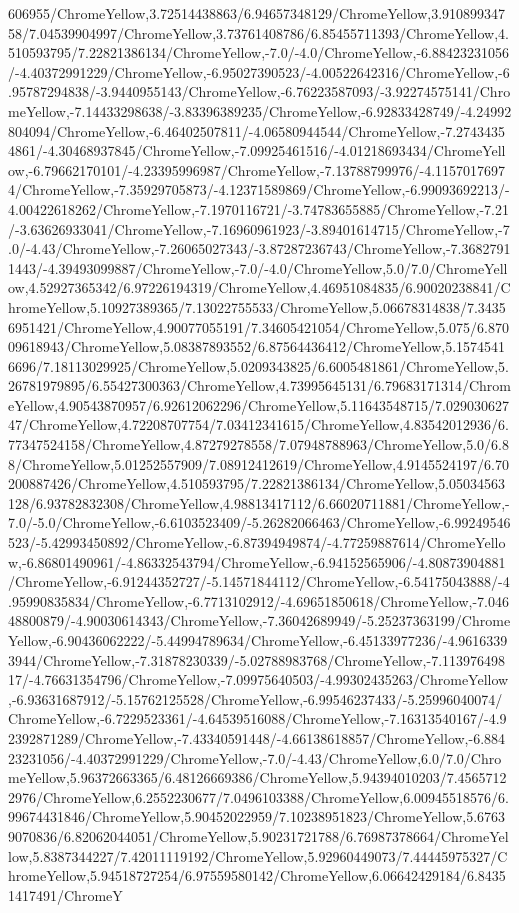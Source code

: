 {\begin{tikzternal}
606955/ChromeYellow,3.72514438863/6.94657348129/ChromeYellow,3.91089934758/7.04539904997/ChromeYellow,3.73761408786/6.85455711393/ChromeYellow,4.510593795/7.22821386134/ChromeYellow,-7.0/-4.0/ChromeYellow,-6.88423231056/-4.40372991229/ChromeYellow,-6.95027390523/-4.00522642316/ChromeYellow,-6.95787294838/-3.9440955143/ChromeYellow,-6.76223587093/-3.92274575141/ChromeYellow,-7.14433298638/-3.83396389235/ChromeYellow,-6.92833428749/-4.24992804094/ChromeYellow,-6.46402507811/-4.06580944544/ChromeYellow,-7.27434354861/-4.30468937845/ChromeYellow,-7.09925461516/-4.01218693434/ChromeYellow,-6.79662170101/-4.23395996987/ChromeYellow,-7.13788799976/-4.11570176974/ChromeYellow,-7.35929705873/-4.12371589869/ChromeYellow,-6.99093692213/-4.00422618262/ChromeYellow,-7.1970116721/-3.74783655885/ChromeYellow,-7.21/-3.63626933041/ChromeYellow,-7.16960961923/-3.89401614715/ChromeYellow,-7.0/-4.43/ChromeYellow,-7.26065027343/-3.87287236743/ChromeYellow,-7.36827911443/-4.39493099887/ChromeYellow,-7.0/-4.0/ChromeYellow,5.0/7.0/ChromeYellow,4.52927365342/6.97226194319/ChromeYellow,4.46951084835/6.90020238841/ChromeYellow,5.10927389365/7.13022755533/ChromeYellow,5.06678314838/7.34356951421/ChromeYellow,4.90077055191/7.34605421054/ChromeYellow,5.075/6.87009618943/ChromeYellow,5.08387893552/6.87564436412/ChromeYellow,5.15745416696/7.18113029925/ChromeYellow,5.0209343825/6.6005481861/ChromeYellow,5.26781979895/6.55427300363/ChromeYellow,4.73995645131/6.79683171314/ChromeYellow,4.90543870957/6.92612062296/ChromeYellow,5.11643548715/7.02903062747/ChromeYellow,4.72208707754/7.03412341615/ChromeYellow,4.83542012936/6.77347524158/ChromeYellow,4.87279278558/7.07948788963/ChromeYellow,5.0/6.88/ChromeYellow,5.01252557909/7.08912412619/ChromeYellow,4.9145524197/6.70200887426/ChromeYellow,4.510593795/7.22821386134/ChromeYellow,5.05034563128/6.93782832308/ChromeYellow,4.98813417112/6.66020711881/ChromeYellow,-7.0/-5.0/ChromeYellow,-6.6103523409/-5.26282066463/ChromeYellow,-6.99249546523/-5.42993450892/ChromeYellow,-6.87394949874/-4.77259887614/ChromeYellow,-6.86801490961/-4.86332543794/ChromeYellow,-6.94152565906/-4.80873904881/ChromeYellow,-6.91244352727/-5.14571844112/ChromeYellow,-6.54175043888/-4.95990835834/ChromeYellow,-6.7713102912/-4.69651850618/ChromeYellow,-7.04648800879/-4.90030614343/ChromeYellow,-7.36042689949/-5.25237363199/ChromeYellow,-6.90436062222/-5.44994789634/ChromeYellow,-6.45133977236/-4.96163393944/ChromeYellow,-7.31878230339/-5.02788983768/ChromeYellow,-7.11397649817/-4.76631354796/ChromeYellow,-7.09975640503/-4.99302435263/ChromeYellow,-6.93631687912/-5.15762125528/ChromeYellow,-6.99546237433/-5.25996040074/ChromeYellow,-6.7229523361/-4.64539516088/ChromeYellow,-7.16313540167/-4.92392871289/ChromeYellow,-7.43340591448/-4.66138618857/ChromeYellow,-6.88423231056/-4.40372991229/ChromeYellow,-7.0/-4.43/ChromeYellow,6.0/7.0/ChromeYellow,5.96372663365/6.48126669386/ChromeYellow,5.94394010203/7.45657122976/ChromeYellow,6.2552230677/7.0496103388/ChromeYellow,6.00945518576/6.99674431846/ChromeYellow,5.90452022959/7.10238951823/ChromeYellow,5.67639070836/6.82062044051/ChromeYellow,5.90231721788/6.76987378664/ChromeYellow,5.8387344227/7.42011119192/ChromeYellow,5.92960449073/7.44445975327/ChromeYellow,5.94518727254/6.97559580142/ChromeYellow,6.06642429184/6.84351417491/ChromeY
\end{tikzternal}}
